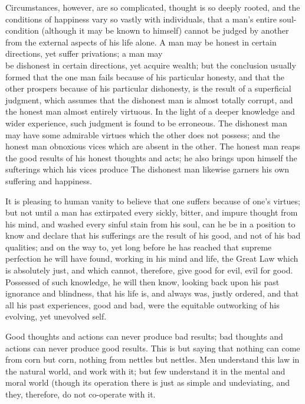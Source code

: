\documentclass[10pt]{article}
\begin{document}
Circumstances, however, are so complicated, thought is so deeply rooted, and the conditions of happiness vary so vastly with individuals, that a man's entire soul-condition (although it may be known to himself) cannot be judged by another from the external aspects of his life alone. A man may be honest in certain directions, yet suffer privations; a man may\\
be dishonest in certain directions, yet acquire wealth; but the conclusion usually formed that the one man fails because of his particular honesty, and that the other prospers because of his particular dishonesty, is the result of a superficial judgment, which assumes that the dishonest man is almost totally corrupt, and the honest man almost entirely virtuous. In the light of a deeper knowledge and wider experience, such judgment is found to be erroneous. The dishonest man may have some admirable virtues which the other does not possess; and the honest man obnoxious vices which are absent in the other. The honest man reaps the good results of his honest thoughts and acts; he also brings upon himself the sufterings which his vices produce The dishonest man likewise garners his own suffering and happiness.

It is pleasing to human vanity to believe that one suffers because of one's virtues; but not until a man has extirpated every sickly, bitter, and impure thought from his mind, and washed every sinful stain from his soul, can he be in a position to know and declare that his sufferings are the result of his good, and not of his bad qualities; and on the way to, yet long before he has reached that supreme perfection he will have found, working in his mind and life, the Great Law which is absolutely just, and which cannot, therefore, give good for evil, evil for good. Possessed of such knowledge, he will then know, looking back upon his past ignorance and blindness, that his life is, and always was, justly ordered, and that all his past experiences, good and bad, were the equitable outworking of his evolving, yet unevolved self.

Good thoughts and actions can never produce bad results; bad thoughts and actions can never produce good results. This is but saying that nothing can come from corn but corn, nothing from nettles but nettles. Men understand this law in the natural world, and work with it; but few understand it in the mental and moral world (though its operation there is just as simple and undeviating, and they, therefore, do not co-operate with it.
\end{document}
